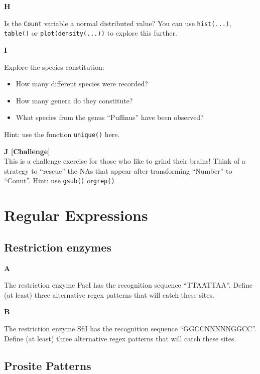 \documentclass[]{book}
\providecommand{\tightlist}{%
  \setlength{\itemsep}{0pt}\setlength{\parskip}{0pt}}
\begin{document}
\textbf{H}

Is the \texttt{Count} variable a normal distributed value? You can use \texttt{hist(...)}, \texttt{table()} or \texttt{plot(density(...))} to explore this further.

\textbf{I}

Explore the species constitution:

\begin{itemize}
\tightlist
\item
  How many different species were recorded?
\item
  How many genera do they constitute?
\item
  What species from the genus ``Puffinus'' have been observed?
\end{itemize}

Hint: use the function \texttt{unique()} here.

\textbf{J {[}Challenge{]}}\\
This is a challenge exercise for those who like to grind their brains! Think of a strategy to ``rescue'' the NAs that appear after transforming ``Number'' to ``Count''. Hint: use \texttt{gsub()} or\texttt{grep()}

\hypertarget{regular-expressions}{%
\section{Regular Expressions}\label{regular-expressions}}

\hypertarget{restriction-enzymes-1}{%
\subsection{Restriction enzymes}\label{restriction-enzymes-1}}

\textbf{A}

The restriction enzyme PacI has the recognition sequence ``TTAATTAA''. Define (at least) three alternative regex patterns that will catch these sites.

\textbf{B}

The restriction enzyme SfiI has the recognition sequence ``GGCCNNNNNGGCC''. Define (at least) three alternative regex patterns that will catch these sites.

\hypertarget{prosite-patterns-1}{%
\subsection{Prosite Patterns}\label{prosite-patterns-1}}
\end{document}
